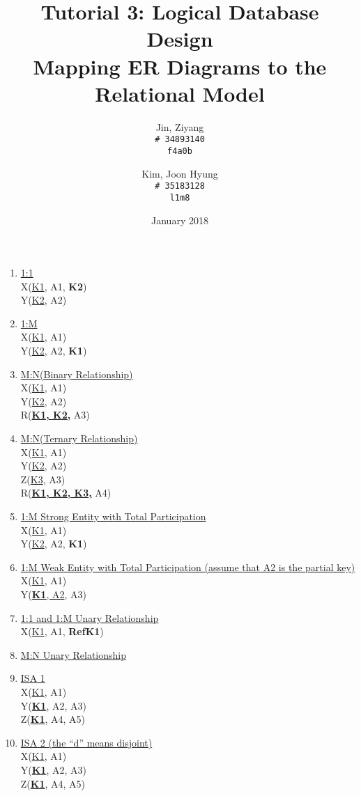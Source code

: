 \documentclass{article}
\title{%
	Tutorial 3: Logical Database Design \\
	\large Mapping ER Diagrams to the Relational Model}
\author{
	Jin, Ziyang\\
	\texttt{\# 34893140}\\
	\texttt{f4a0b}
	\and
	Kim, Joon Hyung\\
	\texttt{\# 35183128}\\
	\texttt{l1m8}
}
\date{January 2018}
\begin{document}
	\maketitle
	\begin{enumerate}
		\item \underline{1:1} \\
			X(\underline{K1}, A1, \textbf{K2}) \\
			Y(\underline{K2}, A2) \\
		\item \underline{1:M} \\
			X(\underline{K1}, A1) \\
			Y(\underline{K2}, A2, \textbf{K1}) \\
		\item \underline{M:N(Binary Relationship)} \\
			X(\underline{K1}, A1) \\
			Y(\underline{K2}, A2) \\
			R(\textbf{\underline{K1, K2,}} A3) \\
		\item \underline{M:N(Ternary Relationship)} \\
			X(\underline{K1}, A1) \\
			Y(\underline{K2}, A2) \\
			Z(\underline{K3}, A3) \\
			R(\textbf{\underline{K1, K2, K3,}} A4) \\
		\item \underline{1:M Strong Entity with Total Participation}\\
			X(\underline{K1}, A1) \\
			Y(\underline{K2}, A2, \textbf{K1}) \\
		\item \underline{1:M Weak Entity with Total Participation (assume that A2 is the partial key)} \\
			X(\underline{K1}, A1) \\
			Y(\underline{\textbf{K1}, A2}, A3) \\
		\item \underline{1:1 and 1:M Unary Relationship} \\
			X(\underline{K1}, A1, \textbf{RefK1}) \\
		\item \underline{M:N Unary Relationship} \\
		\item \underline{ISA 1}\\
			X(\underline{K1}, A1) \\
			Y(\textbf{\underline{K1}}, A2, A3) \\
			Z(\textbf{\underline{K1}}, A4, A5) \\
		\item \underline{ISA 2 (the “d” means disjoint)} \\
			X(\underline{K1}, A1) \\
			Y(\textbf{\underline{K1}}, A2, A3) \\
			Z(\textbf{\underline{K1}}, A4, A5) \\
	\end{enumerate}
	
\end{document}
